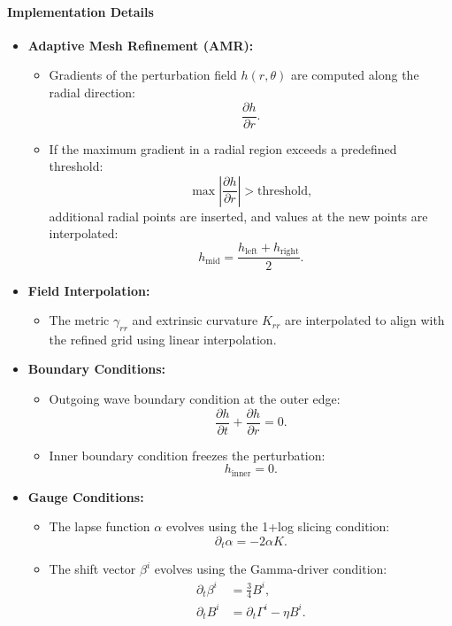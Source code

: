 \documentclass[12pt]{article}
\begin{document}
\paragraph{Implementation Details}
\begin{itemize}
    \item \textbf{Adaptive Mesh Refinement (AMR):}
    \begin{itemize}
        \item Gradients of the perturbation field $h(r, \theta)$ are computed along the radial direction:
        \[
        \frac{\partial h}{\partial r}.
        \]
        \item If the maximum gradient in a radial region exceeds a predefined threshold:
        \[
        \max \left| \frac{\partial h}{\partial r} \right| > \text{threshold},
        \]
        additional radial points are inserted, and values at the new points are interpolated:
        \[
        h_{\text{mid}} = \frac{h_{\text{left}} + h_{\text{right}}}{2}.
        \]
    \end{itemize}
    \item \textbf{Field Interpolation:}
    \begin{itemize}
        \item The metric $\gamma_{rr}$ and extrinsic curvature $K_{rr}$ are interpolated to align with the refined grid using linear interpolation.
    \end{itemize}
    \item \textbf{Boundary Conditions:}
    \begin{itemize}
        \item Outgoing wave boundary condition at the outer edge:
        \[
        \frac{\partial h}{\partial t} + \frac{\partial h}{\partial r} = 0.
        \]
        \item Inner boundary condition freezes the perturbation:
        \[
        h_{\text{inner}} = 0.
        \]
    \end{itemize}
    \item \textbf{Gauge Conditions:}
    \begin{itemize}
        \item The lapse function $\alpha$ evolves using the 1+log slicing condition:
        \[
        \partial_t \alpha = -2 \alpha K.
        \]
        \item The shift vector $\beta^i$ evolves using the Gamma-driver condition:
        \begin{align*}
        \partial_t \beta^i &= \frac{3}{4} B^i, \\
        \partial_t B^i &= \partial_t \Gamma^i - \eta B^i.
        \end{align*}
    \end{itemize}
\end{itemize}
\end{document}
